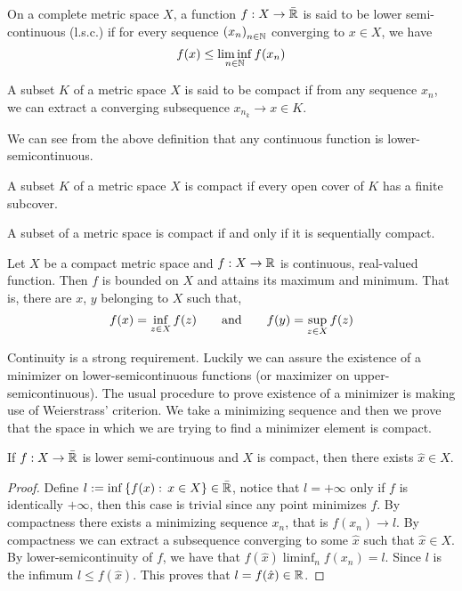 \begin{definition}
	On a complete metric space $X$, a function $f: X\rightarrow\bar{\mathbb{R}}$ is said to be lower semi-continuous (l.s.c.) if for every sequence $\left( x_n \right)_{n\in\mathbb{N}}$ converging to $x\in X$, we have \begin{equation*}
		f(x)\leq \liminf_{n\in \mathbb{N}} f(x_n)
	\end{equation*}
\end{definition}

\begin{definition}
	A subset $K$ of a metric space $X$ is said to be compact if from any sequence $x_n$, we can extract a converging subsequence $x_{n_k} \rightarrow x \in K$.
\end{definition}
We can see from the above definition that any continuous function is lower-semicontinuous. 

\begin{definition}[Compactness]
		A subset $K$ of a metric space $X$ is compact if every open cover of $K$ has a finite subcover. 
\end{definition}

\begin{theorem}
	A subset of a metric space is compact if and only if it is sequentially compact.
\end{theorem}

\begin{theorem}
	Let $X$ be a compact metric space and $f: X\rightarrow \mathbb{R}$ is continuous, real-valued function. Then $f$ is bounded on $X$ and attains its maximum and minimum. That is, there are $x$, $y$ belonging to $X$ such that,
	\begin{equation*}
		f(x)=\inf_{z\in X}f(z) \qquad \mathrm{and} \qquad f(y)=\sup_{z \in X} f(z)
	\end{equation*}
\end{theorem}
Continuity is a strong requirement. Luckily we can assure the existence of a minimizer on lower-semicontinuous functions (or maximizer on upper-semicontinuous). The usual procedure to prove existence of a minimizer is making use of Weierstrass' criterion. We take a minimizing sequence and then we prove that the space in which we are trying to find a minimizer element is compact.
\begin{theorem}
	If $f: X\rightarrow\bar{\mathbb{R}}$ is lower semi-continuous and $X$ is compact, then there exists $\hat x \in X$.
	\begin{proof}
		Define $l:=\inf\left\lbrace f(x): \, x \in X \right\rbrace \in \bar{\mathbb{R}}$, notice that $l=+\infty$ only if $f$ is identically $+\infty$, then this case is trivial since any point minimizes $f$. By compactness there exists a minimizing sequence $x_n$, that is $f(x_n)\rightarrow l$. By compactness we can extract a subsequence converging to some $\hat x$ such that $\hat x \in X$. By lower-semicontinuity of $f$, we have that $f(\hat x)\liminf_n f(x_n)=l$. Since $l$ is the infimum $l\leq f(\hat x)$. This proves that $l=f(\hat{x}) \in \mathbb{R}$.
	\end{proof}
\end{theorem}

